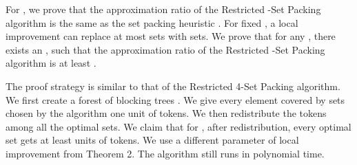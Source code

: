 \documentclass[runningheads,a4paper]{llncs}
\numberwithin{equation}{section}
\begin{document}
For , we prove that the approximation ratio of the Restricted -Set Packing algorithm is the same as the set packing heuristic \cite{schrijver}. For fixed , a local improvement can replace at most  sets with  sets. We prove that for any , there exists an , such that the approximation ratio of the Restricted -Set Packing algorithm is at least .

The proof strategy is similar to that of the Restricted 4-Set Packing algorithm. We first create a forest of blocking trees . We give every element covered by sets chosen by the algorithm one unit of tokens. We then redistribute the tokens among all the optimal sets. We claim that for , after redistribution, every optimal set gets at least  units of tokens. We use a different parameter of local improvement from Theorem 2. The algorithm still runs in polynomial time.
\end{document}
